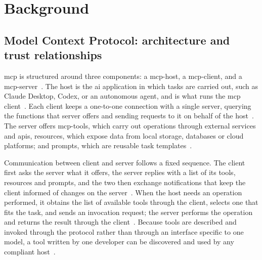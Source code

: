 %

\chapter{Background}\label{ch:background}

\section{Model Context Protocol: architecture and trust relationships}\label{sec:mcp-architecture}

\Gls{mcp} is structured around three components: a \gls{mcp-host}, a \gls{mcp-client}, and a \gls{mcp-server}~\cite[p.~5]{Hou2026}. The host is the \gls{ai} application in which tasks are carried out, such as Claude Desktop, Codex, or an autonomous agent, and is what runs the \gls{mcp} client~\cite[pp.~5--6]{Hou2026}. Each client keeps a one-to-one connection with a single server, querying the functions that server offers and sending requests to it on behalf of the host~\cite[p.~6]{Hou2026}. The server offers \glspl{mcp-tool}, which carry out operations through external services and \glspl{api}, resources, which expose data from local storage, databases or cloud platforms; and prompts, which are reusable task templates~\cite[p.~6]{Hou2026}.

Communication between client and server follows a fixed sequence. The client first asks the server what it offers, the server replies with a list of its tools, resources and prompts, and the two then exchange notifications that keep the client informed of changes on the server~\cite[p.~7]{Hou2026}. When the host needs an operation performed, it obtains the list of available tools through the client, selects one that fits the task, and sends an invocation request; the server performs the operation and returns the result through the client~\cite[p.~6]{Hou2026}. Because tools are described and invoked through the protocol rather than through an interface specific to one model, a tool written by one developer can be discovered and used by any compliant host~\cite[p.~6]{Hou2026}.

